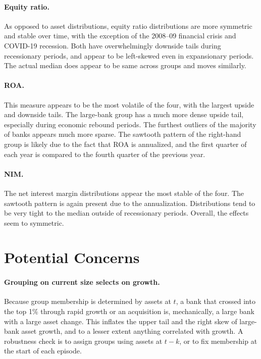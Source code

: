 \documentclass[11pt]{article}
\begin{document}
\paragraph{Equity ratio.}
As opposed to asset distributions, equity ratio distributions are more symmetric and stable over time, with the exception of the 2008--09 financial crisis and COVID-19 recession. Both have overwhelmingly downside tails during recessionary periods, and appear to be left-skewed even in expansionary periods. The actual median does appear to be same across groups and moves similarly.

\paragraph{ROA.} 
This measure appears to be the most volatile of the four, with the largest upside and downside tails. The large-bank group has a much more dense upside tail, especially during economic rebound periods. The furthest outliers of the majority of banks appears much more sparse. The sawtooth pattern of the right-hand group is likely due to the fact that ROA is annualized, and the first quarter of each year is compared to the fourth quarter of the previous year. 

\paragraph{NIM.} 
The net interest margin distributions appear the most stable of the four. The sawtooth pattern is again present due to the annualization. Distributions tend to be very tight to the median outside of recessionary periods. Overall, the effects seem to symmetric.

\section{Potential Concerns}\label{sec:comments}

\paragraph{Grouping on current size selects on growth.}
Because group membership is determined by assets at $t$, a bank that crossed into the top 1\% through rapid growth or an acquisition is, mechanically, a large bank with a large asset change. This inflates the upper tail and the right skew of large-bank asset growth, and to a lesser extent anything correlated with growth. A robustness check is to assign groups using assets at $t-k$, or to fix membership at the start of each episode.
\end{document}
